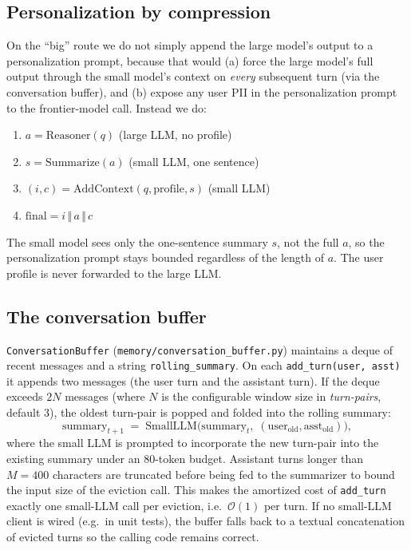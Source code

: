 \documentclass{article}
\begin{document}
\subsection{Personalization by compression}
\label{sec:compress}

On the ``big'' route we do not simply append the large model's output to a
personalization prompt, because that would (a) force the large model's
full output through the small model's context on \emph{every} subsequent
turn (via the conversation buffer), and (b) expose any user PII in the
personalization prompt to the frontier-model call. Instead we do:
\begin{enumerate}
    \item $a = \mathrm{Reasoner}(q)$ \hfill (large LLM, no profile)
    \item $s = \mathrm{Summarize}(a)$ \hfill (small LLM, one sentence)
    \item $(i, c) = \mathrm{AddContext}(q, \mathrm{profile}, s)$ \hfill (small LLM)
    \item $\mathrm{final} = i \,\Vert\, a \,\Vert\, c$
\end{enumerate}
The small model sees only the one-sentence summary $s$, not the full $a$, so
the personalization prompt stays bounded regardless of the length of $a$.
The user profile is never forwarded to the large LLM.

\subsection{The conversation buffer}
\label{sec:buffer}

\texttt{ConversationBuffer} (\texttt{memory/conversation\_buffer.py}) maintains
a deque of recent messages and a string \texttt{rolling\_summary}. On each
\texttt{add\_turn(user, asst)} it appends two messages (the user turn and
the assistant turn). If the deque exceeds $2N$ messages (where $N$ is the
configurable window size in \emph{turn-pairs}, default 3), the oldest
turn-pair is popped and folded into the rolling summary:
\begin{equation}
  \mathrm{summary}_{t+1} \;=\; \mathrm{SmallLLM}\bigl(
    \mathrm{summary}_t, \;(\mathrm{user}_\mathrm{old}, \mathrm{asst}_\mathrm{old})
  \bigr),
  \label{eq:summary}
\end{equation}
where the small LLM is prompted to incorporate the new turn-pair into the
existing summary under an 80-token budget. Assistant turns longer than
$M = 400$ characters are truncated before being fed to the summarizer to
bound the input size of the eviction call. This makes the amortized cost of
\texttt{add\_turn} exactly one small-LLM call per eviction, i.e.\ $\mathcal{O}(1)$
per turn. If no small-LLM client is wired (e.g.\ in unit tests), the buffer
falls back to a textual concatenation of evicted turns so the calling code
remains correct.
\end{document}
